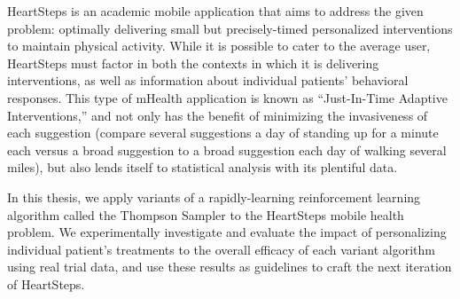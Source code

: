 HeartSteps is an academic mobile application that aims to address the given problem: optimally delivering small but precisely-timed personalized interventions to maintain physical activity.  While it is possible to cater to the average user, HeartSteps must factor in both the contexts in which it is delivering interventions, as well as information about individual patients' behavioral responses. This type of mHealth application is known as ``Just-In-Time Adaptive Interventions,'' and not only has the benefit of minimizing the invasiveness of each suggestion (compare several suggestions a day of standing up for a minute each versus a broad suggestion to a broad suggestion each day of walking several miles), but also lends itself to statistical analysis with its plentiful data.  

In this thesis, we apply variants of a rapidly-learning reinforcement learning algorithm called the Thompson Sampler to the HeartSteps mobile health problem.  We experimentally investigate and evaluate the impact of personalizing individual patient's treatments to the overall efficacy of each variant algorithm using real trial data, and use these results as guidelines to craft the next iteration of HeartSteps.



